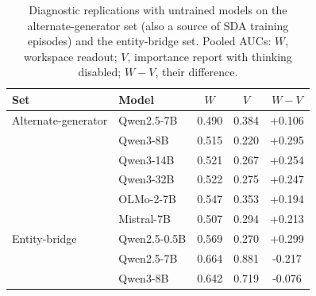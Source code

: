 \begin{table}[t]
\centering
\caption{Diagnostic replications with untrained models on the alternate-generator set (also a source of SDA training episodes) and the entity-bridge set. Pooled AUCs: $W$,
workspace readout; $V$, importance report with thinking disabled; $W-V$, their difference. }
\label{tab:replications}
\small
\begin{tabular}{llccc}
\toprule
Set & Model & $W$ & $V$ & $W-V$ \\
\midrule
Alternate-generator & Qwen2.5-7B & 0.490 & 0.384 & +0.106 \\
 & Qwen3-8B & 0.515 & 0.220 & +0.295 \\
 & Qwen3-14B & 0.521 & 0.267 & +0.254 \\
 & Qwen3-32B & 0.522 & 0.275 & +0.247 \\
 & OLMo-2-7B & 0.547 & 0.353 & +0.194 \\
 & Mistral-7B & 0.507 & 0.294 & +0.213 \\
\addlinespace
Entity-bridge & Qwen2.5-0.5B & 0.569 & 0.270 & +0.299 \\
 & Qwen2.5-7B & 0.664 & 0.881 & \textcolor{loss}{-0.217} \\
 & Qwen3-8B & 0.642 & 0.719 & -0.076 \\
\bottomrule
\end{tabular}
\end{table}
